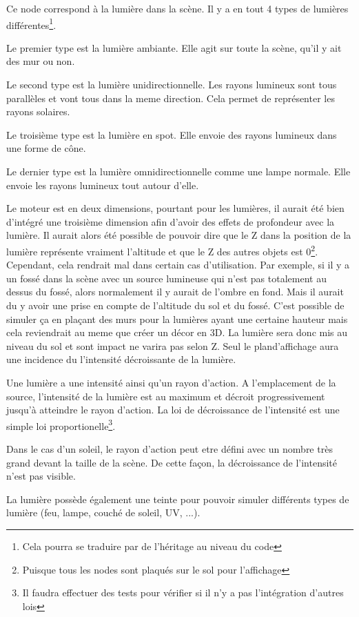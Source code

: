 \documentclass[11pt, a4paper]{article}
\begin{document}
Ce node correspond à la lumière dans la scène. Il y a en tout 4 types de lumières différentes\footnote{Cela pourra se traduire par de l'héritage au niveau du code}.

Le premier type est la lumière ambiante. Elle agit sur toute la scène, qu'il y ait des mur ou non.

Le second type est la lumière unidirectionnelle. Les rayons lumineux sont tous parallèles et vont tous dans la meme direction.
Cela permet de représenter les rayons solaires.

Le troisième type est la lumière en spot. Elle envoie des rayons lumineux dans une forme de cône.

Le dernier type est la lumière omnidirectionnelle comme une lampe normale. Elle envoie les rayons lumineux tout autour d'elle.

Le moteur est en deux dimensions, pourtant pour les lumières, il aurait été bien d'intégré une troisième dimension afin d'avoir des effets de profondeur avec la lumière. Il aurait alors été possible de pouvoir dire que le Z dans la position de la lumière représente vraiment l'altitude et que le Z des autres objets est 0\footnote{Puisque tous les nodes sont plaqués sur le sol pour l'affichage}. Cependant, cela rendrait mal dans certain cas d'utilisation. Par exemple, si il y a un fossé dans la scène avec un source lumineuse qui n'est pas totalement au dessus du fossé, alors normalement il y aurait de l'ombre en fond. Mais il aurait du y avoir une prise en compte de l'altitude du sol et du fossé. C'est possible de simuler ça en plaçant des murs pour la lumières ayant une certaine hauteur mais cela reviendrait au meme que créer un décor en 3D.
La lumière sera donc mis au niveau du sol et sont impact ne varira pas selon Z. Seul le pland'affichage aura une incidence du l'intensité décroissante de la lumière.

Une lumière a une intensité ainsi qu'un rayon d'action. A l'emplacement de la source, l'intensité de la lumière est au maximum et décroit progressivement jusqu'à atteindre le rayon d'action. La loi de décroissance de l'intensité est une simple loi proportionelle\footnote{Il faudra effectuer des tests pour vérifier si il n'y a pas l'intégration d'autres lois}.

Dans le cas d'un soleil, le rayon d'action peut etre défini avec un nombre très grand devant la taille de la scène. De cette façon, la décroissance de l'intensité n'est pas visible.

La lumière possède également une teinte pour pouvoir simuler différents types de lumière (feu, lampe, couché de soleil, UV, ...).
\end{document}
